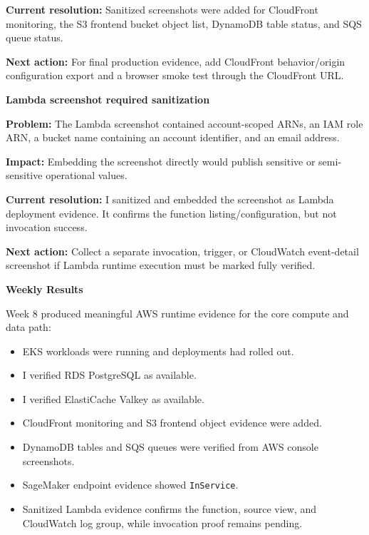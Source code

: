 \textbf{Current resolution:} Sanitized screenshots were added for
CloudFront monitoring, the S3 frontend bucket object list, DynamoDB
table status, and SQS queue status.

\textbf{Next action:} For final production evidence, add CloudFront
behavior/origin configuration export and a browser smoke test through
the CloudFront URL.

\vspace{0.5em}\noindent\textbf{Lambda screenshot required
sanitization}\par

\textbf{Problem:} The Lambda screenshot contained account-scoped ARNs,
an IAM role ARN, a bucket name containing an account identifier, and an
email address.

\textbf{Impact:} Embedding the screenshot directly would publish
sensitive or semi-sensitive operational values.

\textbf{Current resolution:} I sanitized and embedded the screenshot as
Lambda deployment evidence. It confirms the function
listing/configuration, but not invocation success.

\textbf{Next action:} Collect a separate invocation, trigger, or
CloudWatch event-detail screenshot if Lambda runtime execution must be
marked fully verified.

\vspace{0.5em}\noindent\textbf{Weekly Results}\par

Week 8 produced meaningful AWS runtime evidence for the core compute and
data path:

\begin{itemize}
\tightlist
\item
  EKS workloads were running and deployments had rolled out.
\item
  I verified RDS PostgreSQL as available.
\item
  I verified ElastiCache Valkey as available.
\item
  CloudFront monitoring and S3 frontend object evidence were added.
\item
  DynamoDB tables and SQS queues were verified from AWS console
  screenshots.
\item
  SageMaker endpoint evidence showed \texttt{InService}.
\item
  Sanitized Lambda evidence confirms the function, source view, and
  CloudWatch log group, while invocation proof remains pending.
\end{itemize}

